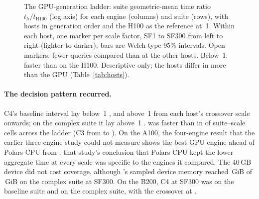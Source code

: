 \documentclass[sigconf, nonacm]{acmart}
\begin{document}
\begin{figure}[t]
\centering
{}
\caption{The GPU-generation ladder: suite geometric-mean time ratio
$t_{h}/t_{\mathrm{H100}}$ (log axis) for each engine (columns) and suite
(rows), with hosts in generation order and the H100 as the reference at~1.
Within each host, one marker per scale factor, SF1 to SF300 from left to right
(lighter to darker); bars are Welch-type 95\% intervals. Open markers: fewer
queries compared than at the other hosts. Below~1: faster than on the H100.
Descriptive only; the hosts differ in more than the GPU
(Table~\ref{tab:hosts}). \chartnote}
\label{fig:f11}
\end{figure}

\paragraph{The decision pattern recurred.} C4's baseline interval lay below~1
, and above~1 from each host's crossover
scale onwards; on the complex suite it lay above~1
. \polarsgpu{} was faster than \sparkgpu{} in
 of  suite--scale cells
across the ladder (C3 from  to ).
\ifaonehundredran
On the A100, the four-engine result that the earlier three-engine study could
not measure shows the best GPU engine ahead of Polars CPU from
; that study's conclusion that Polars CPU kept
the lower aggregate time at every scale was specific to the engines it
compared. The 40\,GB device did not cost coverage, although \polarsgpu{}'s
sampled device memory reached
\,GiB of
\,GiB on the complex suite at SF300.
\fi
\ifbtwohundredran
On the B200, C4 at SF300 was  on the
baseline suite and  on the complex suite,
with the crossover at .
\fi
\end{document}
